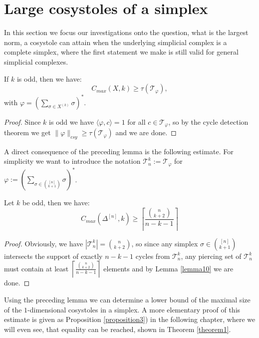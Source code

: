 \section{Large cosystoles of a simplex}

In this section we focus our investigations onto the question, what is the largest norm, a cosystole can attain when the underlying simplicial complex is a complete simplex, where the first statement we make is still valid for general simplicial complexes. 

\begin{lem}\label{lemma10}
If \(k\) is odd, then we have:
\[
C_{max}(X,k)\geq\tau(\mathcal{T}_{\varphi}),
\]
with \(\varphi=\left(\sum\limits_{\sigma\in X^{(k)}}\sigma\right)^*\).
\begin{proof}
Since \(k\) is odd we have \(\langle\varphi,c\rangle=1\) for all \(c\in\mathcal{T}_{\varphi}\), so by the cycle detection theorem we get \(\|\varphi\|_{csy}\geq\tau(\mathcal{T}_{\varphi})\) and we are done.
\end{proof}
\end{lem}

A direct consequence of the preceding lemma is the following estimate. For simplicity we want to introduce the notation \(\mathcal{T}_n^k:=\mathcal{T}_{\varphi}\) for \(\varphi:=\left(\sum\limits_{\sigma\in\binom{[n]}{k+1}}\sigma\right)^*\).

\begin{prop}\label{proposition11}
Let \(k\) be odd, then we have:
\[
C_{max}(\Delta^{[n]},k)\geq \left\lceil\frac{\binom{n}{k+2}}{n-k-1}\right\rceil
\]
\begin{proof}
Obviously, we have \(|\mathcal{T}_n^k|=\binom{n}{k+2}\), so since any simplex \(\sigma\in\binom{[n]}{k+1}\) intersects the support of exactly \(n-k-1\) cycles from \(\mathcal{T}_n^k\), any piercing set of \(\mathcal{T}_n^k\) must contain at least \(\left\lceil\frac{\binom{n}{k+2}}{n-k-1}\right\rceil\) elements and by Lemma \ref{lemma10} we are done.
\end{proof}
\end{prop}

Using the preceding lemma we can determine a lower bound of the maximal size of the \(1\)-dimensional cosystoles in a simplex. A more elementary proof of this estimate is given as Proposition \ref{proposition3}) in the following chapter, where we will even see, that equality can be reached, shown in Theorem \ref{theorem1}.

